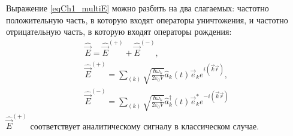Выражение \eqref{eqCh1_multiE} можно разбить на два слагаемых:
частотно положительную часть, в которую входят операторы уничтожения,
и частотно отрицательную часть, в которую входят операторы рождения: 
\begin{eqnarray}
\hat{\vec{E}} = \hat{\vec{E}}^{(+)} + \hat{\vec{E}}^{(-)},
\nonumber \\
\hat{\vec{E}}^{(+)} = \sum_{(k)} \sqrt{\frac{\hbar \omega_k}{2 \varepsilon_0
V}} \hat{a}_k\left(t\right) \vec{e}_k e^{i \left(\vec{k}\vec{r}
  \right)}, 
\nonumber \\
\hat{\vec{E}}^{(-)} = \sum_{(k)} \sqrt{\frac{\hbar \omega_k}{2 \varepsilon_0
V}}
\hat{a}_k^{\dag}\left(t\right) \vec{e}_k^{*} e^{-i \left(\vec{k}\vec{r} \right)}
\label{eqCh1_79}
\end{eqnarray} 
$\hat{\vec{E}}^{(+)}$ соответствует аналитическому сигналу в
классическом случае. 

